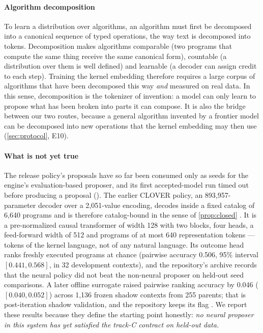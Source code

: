 \paragraph{Algorithm decomposition} To learn a distribution over algorithms, an algorithm must first
be decomposed into a canonical sequence of typed operations, the way text is decomposed into
tokens. Decomposition makes algorithms comparable (two programs that compute the same thing receive
the same canonical form), countable (a distribution over them is well defined) and learnable (a
decoder can assign credit to each step). Training the kernel embedding therefore requires a large
corpus of algorithms that have been decomposed this way \emph{and} measured on real data. In this
sense, decomposition is the tokenizer of invention: a model can only learn to propose what has been
broken into parts it can compose. It is also the bridge between our two routes, because a general
algorithm invented by a frontier model can be decomposed into new operations that the kernel
embedding may then use (\cref{sec:protocol}, E10).

\paragraph{What is not yet true} The release policy's proposals have so far been consumed only as
seeds for the engine's evaluation-based proposer, and its first accepted-model run timed out before
producing a proposal (). The earlier CLOVER policy, an 893,957-parameter decoder
over a 2,051-value encoding, decodes inside a fixed catalog of 6,640 programs and is therefore
catalog-bound in the sense of \cref{prop:closed} \citep{jopedime2026writeup}. It is a
pre-normalized causal transformer of width 128 with two blocks, four heads, a feed-forward width of
512 and programs of at most 640 representation tokens --- tokens of the kernel language, not of any
natural language. Its outcome head ranks freshly executed programs at chance (pairwise accuracy
0.506, 95\% interval $[0.441,0.568]$, in 32 development contexts), and the repository's archive
records that the neural policy did not beat the non-neural proposer on held-out seed comparisons.
A later offline surrogate raised pairwise ranking accuracy by 0.046 ($[0.040,0.052]$) across 1,136
frozen shadow contexts from 255 parents; that is post-iteration shadow validation, and the
repository keeps its flag . We report these results because they define the
starting point honestly: \emph{no neural proposer in this system has yet satisfied the track-C
contract on held-out data.}

